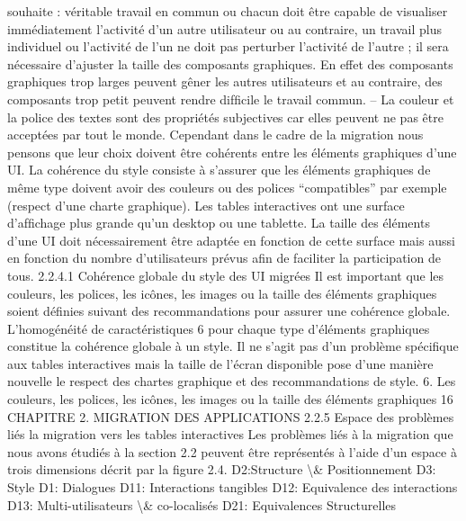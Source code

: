 \documentclass{article}
\begin{document}
souhaite : v\'{e}ritable travail en commun ou chacun doit \^{e}tre capable de visualiser imm\'{e}diatement
l’activit\'{e} d’un autre utilisateur ou au contraire, un travail plus individuel ou l’activit\'{e} de l’un
ne doit pas perturber l’activit\'{e} de l’autre ; il sera n\'{e}cessaire d’ajuster la taille des composants
graphiques. En effet des composants graphiques trop larges peuvent g\^{e}ner les autres utilisateurs
et au contraire, des composants trop petit peuvent rendre difﬁcile le travail commun.
– La couleur et la police des textes sont des propri\'{e}t\'{e}s subjectives car elles peuvent ne pas \^{e}tre
accept\'{e}es par tout le monde. Cependant dans le cadre de la migration nous pensons que leur
choix doivent \^{e}tre coh\'{e}rents entre les \'{e}l\'{e}ments graphiques d’une UI. La coh\'{e}rence du style
consiste \`{a} s’assurer que les \'{e}l\'{e}ments graphiques de m\^{e}me type doivent avoir des couleurs ou
des polices “compatibles” par exemple (respect d’une charte graphique).
Les tables interactives ont une surface d’afﬁchage plus grande qu’un desktop ou une tablette. La
taille des \'{e}l\'{e}ments d’une UI doit n\'{e}cessairement \^{e}tre adapt\'{e}e en fonction de cette surface mais aussi
en fonction du nombre d’utilisateurs pr\'{e}vus aﬁn de faciliter la participation de tous.
2.2.4.1
Coh\'{e}rence globale du style des UI migr\'{e}es
Il est important que les couleurs, les polices, les ic\^{o}nes, les images ou la taille des \'{e}l\'{e}ments graphiques soient d\'{e}ﬁnies suivant des recommandations pour assurer une coh\'{e}rence globale. L’homog\'{e}n\'{e}it\'{e} de caract\'{e}ristiques 6 pour chaque type d’\'{e}l\'{e}ments graphiques constitue la coh\'{e}rence globale
\`{a} un style. Il ne s’agit pas d’un probl\`{e}me sp\'{e}ciﬁque aux tables interactives mais la taille de l’\'{e}cran
disponible pose d’une mani\`{e}re nouvelle le respect des chartes graphique et des recommandations de
style.
6. Les couleurs, les polices, les ic\^{o}nes, les images ou la taille des \'{e}l\'{e}ments graphiques
16
CHAPITRE 2. MIGRATION DES APPLICATIONS
2.2.5
Espace des probl\`{e}mes li\'{e}s la migration vers les tables interactives
Les probl\`{e}mes li\'{e}s \`{a} la migration que nous avons \'{e}tudi\'{e}s \`{a} la section 2.2 peuvent \^{e}tre repr\'{e}sent\'{e}s
\`{a} l’aide d’un espace \`{a} trois dimensions d\'{e}crit par la ﬁgure 2.4.
D2:Structure 
\textbackslash{}& Positionnement
D3: Style
D1: Dialogues
D11: Interactions 
tangibles
D12: Equivalence des 
interactions
D13: Multi-utilisateurs 
\textbackslash{}& co-localis\'{e}s
D21: Equivalences 
Structurelles
\end{document}
